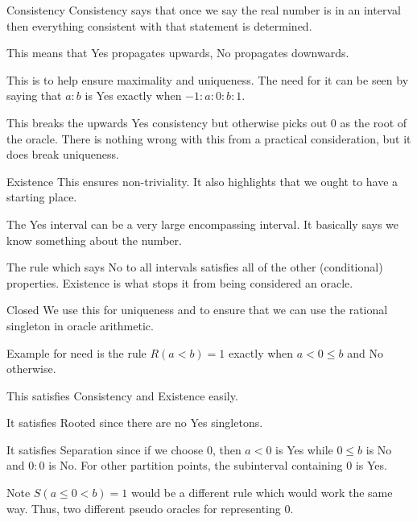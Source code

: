 \documentclass{beamer}
\begin{document}
\begin{frame}{Consistency}
    Consistency says that once we say the real number is in an interval then everything consistent with that statement is determined. 

    This means that Yes propagates upwards, No propagates downwards. 

    This is to help ensure maximality and uniqueness. The need for it can be seen by saying that $a:b$ is Yes exactly when $-1 : a: 0 : b: 1$. 

    This breaks the upwards Yes consistency but otherwise picks out 0 as the root of the oracle. There is nothing wrong with this from a practical consideration, but it does break uniqueness. 
    
\end{frame}


\begin{frame}{Existence}
    This ensures non-triviality. It also highlights that we ought to have a starting place. 

    The Yes interval can be a very large encompassing interval. It basically says we know something about the number. 

    The rule which says No to all intervals satisfies all of the other (conditional) properties. Existence is what stops it from being considered an oracle. 
\end{frame}



\begin{frame}{Closed}
    We use this for uniqueness and to ensure that we can use the rational singleton in oracle arithmetic. 

    Example for need is the rule $R(a<b)= 1$ exactly when $a < 0 \leq b$ and No otherwise. 

    This satisfies Consistency and Existence easily.  

    It satisfies Rooted since there are no Yes singletons. 

    It satisfies Separation since if we choose $0$, then $a < 0$ is Yes while $0 \leq b$ is No and $0:0$ is No. For other partition points, the subinterval containing $0$ is Yes. 

    Note $S(a \leq 0 < b )= 1$ would be a different rule which would work the same way. Thus, two different pseudo oracles for representing 0. 
    
\end{frame}
\end{document}
